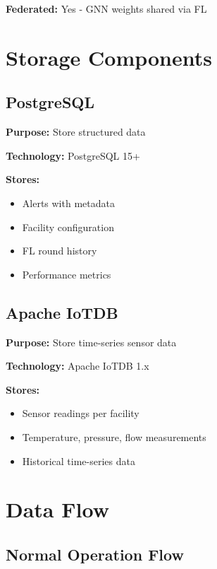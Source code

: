 \documentclass[12pt,a4paper]{article}
\begin{document}
\textbf{Federated:} Yes - GNN weights shared via FL

\section{Storage Components}

\subsection{PostgreSQL}

\textbf{Purpose:} Store structured data

\textbf{Technology:} PostgreSQL 15+

\textbf{Stores:}
\begin{itemize}[leftmargin=1cm,itemsep=0pt]
    \item Alerts with metadata
    \item Facility configuration
    \item FL round history
    \item Performance metrics
\end{itemize}

\subsection{Apache IoTDB}

\textbf{Purpose:} Store time-series sensor data

\textbf{Technology:} Apache IoTDB 1.x

\textbf{Stores:}
\begin{itemize}[leftmargin=1cm,itemsep=0pt]
    \item Sensor readings per facility
    \item Temperature, pressure, flow measurements
    \item Historical time-series data
\end{itemize}


\section{Data Flow}

\subsection{Normal Operation Flow}
\end{document}
